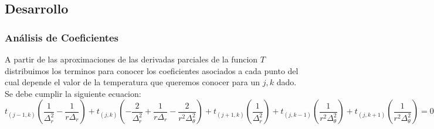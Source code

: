 \subsection{Desarrollo}

\subsubsection{Análisis de Coeficientes}
A partir de las aproximaciones de las derivadas parciales de la funcion $T$ distribuimos los terminos para conocer los coeficientes asociados a cada punto del cual depende el valor de la temperatura que queremos conocer para un $j,k$ dado. Se debe cumplir la siguiente ecuacion: \\
$$t_{(j-1, k)} (\frac{1}{\Delta^2_r}-\frac{1}{r \Delta_r}) +
t_{(j, k)} (-\frac{2}{\Delta^2_r}+\frac{1}{r \Delta_r}-\frac{2}{r^2 \Delta^2_\theta}) + 
t_{(j+1, k)} (\frac{1}{\Delta^2_r}) + 
t_{(j, k-1)} (\frac{1}{r^2 \Delta^2_\theta}) +
t_{(j, k+1)} (\frac{1}{r^2 \Delta^2_\theta}) = 0 $$ \\

